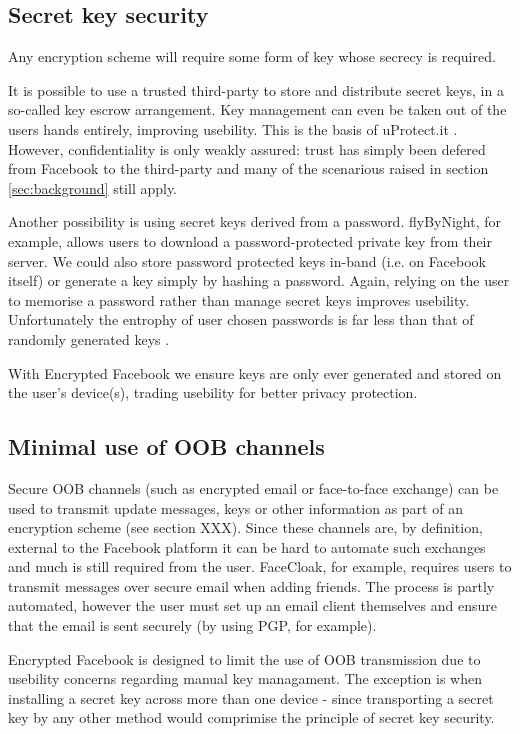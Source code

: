 \FloatBarrier
\subsection{Secret key security}

Any encryption scheme will require some form of key whose secrecy is required.

It is possible to use a trusted third-party to store and distribute secret keys, in a so-called key escrow arrangement. Key management can even be taken out of the users hands entirely, improving usebility. This is the basis of uProtect.it \cite{uprotect}. However, confidentiality is only weakly assured: trust has simply been defered from Facebook to the third-party and many of the scenarious raised in section \ref{sec:background} still apply.

Another possibility is using secret keys derived from a password. flyByNight, for example, allows users to download a password-protected private key from their server. We could also store password protected keys in-band (i.e. on Facebook itself) or generate a key simply by hashing a password. Again, relying on the user to memorise a password rather than manage secret keys improves usebility. Unfortunately the entrophy of user chosen passwords is far less than that of randomly generated keys \cite{password}.

With Encrypted Facebook we ensure keys are only ever generated and stored on the user's device(s), trading usebility for better privacy protection.


\FloatBarrier
\subsection{Minimal use of OOB channels}

Secure \ac{OOB} channels (such as encrypted email or face-to-face exchange) can be used to transmit update messages, keys or other information as part of an encryption scheme (see section XXX). Since these channels are, by definition, external to the Facebook platform it can be hard to automate such exchanges and much is still required from the user. FaceCloak, for example, requires users to transmit messages over secure email when adding friends. The process is partly automated, however the user must set up an email client themselves and ensure that the email is sent securely (by using PGP, for example).

Encrypted Facebook is designed to limit the use of \ac{OOB} transmission due to usebility concerns regarding manual key managament. The exception is when installing a secret key across more than one device - since transporting a secret key by any other method would comprimise the principle of secret key security.


